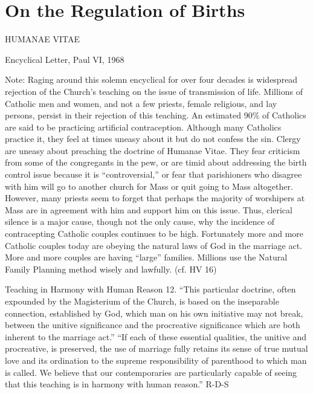 \documentclass[oneside]{book}
\begin{document}

\chapter{On the Regulation of Births}

HUMANAE VITAE

Encyclical Letter, Paul VI, 1968


Note: Raging around this solemn encyclical for over four decades is widespread
rejection of the Church's teaching on the issue of transmission of
life. Millions of Catholic men and women, and not a few priests, female
religious, and lay persons, persist in their rejection of this teaching. An
estimated 90\% of Catholics are said to be practicing artificial
contraception. Although many Catholics practice it, they feel at times uneasy
about it but do not confess the sin. Clergy are uneasy about preaching the
doctrine of Humanae Vitae. They fear criticism from some of the congregants in
the pew, or are timid about addressing the birth control issue because it is
``controversial,'' or fear that parishioners who disagree with him will go to
another church for Mass or quit going to Mass altogether. However, many priests
seem to forget that perhaps the majority of worshipers at Mass are in agreement
with him and support him on this issue. Thus, clerical silence is a major cause,
though not the only cause, why the incidence of contracepting Catholic couples
continues to be high. Fortunately more and more Catholic couples today are
obeying the natural laws of God in the marriage act. More and more couples are
having ``large'' families. Millions use the Natural Family Planning method
wisely and lawfully. (cf. HV 16)

Teaching in Harmony with Human Reason
12. ``This particular doctrine, often expounded by the Magisterium of the
Church, is based on the inseparable connection, established by God, which man on
his own initiative may not break, between the unitive significance and the
procreative significance which are both inherent to the marriage act.'' ``If
each of these essential qualities, the unitive and procreative, is preserved,
the use of marriage fully retains its sense of true mutual love and its
ordination to the supreme responsibility of parenthood to which man is
called. We believe that our contemporaries are particularly capable of seeing
that this teaching is in harmony with human reason.''
R-D-S
\end{document}
